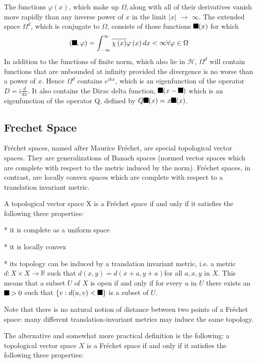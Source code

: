 \documentclass[aps,preprint]{revtex4}%
\providecommand{\U}[1]{\protect\rule{.1in}{.1in}}
\begin{document}
The functions $\varphi\left(  x\right)  $, which make up $\Omega,$along with
all of their derivatives vanish more rapidly than any inverse power of $x$ in
the limit $\left\vert x\right\vert $ $\rightarrow$ $\infty$. The extended
space $\Omega^{d}$, which is conjugate to $%
\Omega
$, consists of those functions $\U{3c7} (x)$ for which%
\[
\left(  \U{3c7} ,\varphi\right)  =\int_{-\infty}^{\infty}\overline{\chi\left(
x\right)  }\varphi\left(  x\right)  dx<\infty\forall\varphi\in\Omega
\]
In addition to the functions of finite norm, which also lie in $\mathcal{H}$,
$\Omega^{d}$ will contain functions that are unbounded at infinity provided
the divergence is no worse than a power of $x$. Hence $\Omega^{d}$ contains
$e^{ikx}$, which is an eigenfunction of the operator $D=i\frac{d}{dx}$. It
also contains the Dirac delta function, $\U{3b4} (x-\U{3bb} )$ which is an
eigenfunction of the operator Q, defined by $Q\U{3c8} (x)=x\U{3c8} (x)$.

\subsection{Frechet Space}

Fr\'{e}chet spaces, named after Maurice Fr\'{e}chet, are special topological
vector spaces. They are generalizations of Banach spaces (normed vector spaces
which are complete with respect to the metric induced by the norm).
Fr\'{e}chet spaces, in contrast, are locally convex spaces which are complete
with respect to a translation invariant metric.

A topological vector space X is a Fr\'{e}chet space if and only if it
satisfies the following three properties:

* it is complete as a uniform space

* it is locally convex

* its topology can be induced by a translation invariant metric, i.e. a metric
$d:X\times X\rightarrow\mathbb{R}$ such that $d(x,y)=d(x+a,y+a)$for all
$a,x,y$ in $X$. This means that a subset $U$ of $X$ is open if and only if for
every $u$ in $U$ there exists an $\U{3b5} >0$ such that $\{v:d(u,v)<\U{3b5}
\}$ is a subset of $U$.

Note that there is no natural notion of distance between two points of a
Fr\'{e}chet space: many different translation-invariant metrics may induce the
same topology.

The alternative and somewhat more practical definition is the following: a
topological vector space $X$ is a Fr\'{e}chet space if and only if it
satisfies the following three properties:
\end{document}
